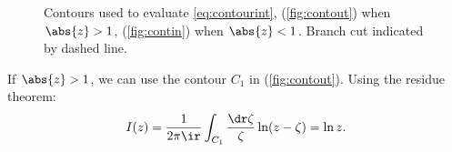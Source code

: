 \documentclass[12pt]{article}
\begin{document}
\begin{figure}
 \begin{center}
 \begin{myenuma}
  \item{}\label{fig:contout}
  \hspace{1cm}
  \item{}\label{fig:contin}
 \end{myenuma}
 \end{center}
  \caption{Contours used to evaluate \eqref{eq:contourint}, (\ref{fig:contout}) when $\abs{z}>1$, (\ref{fig:contin}) when $\abs{z}<1$. Branch cut indicated by dashed line.}\label{fig:contours}
\end{figure}

If $\abs{z}>1$, we can use the contour $C_1$ in (\ref{fig:contout}).
Using the residue theorem:
%
\begin{equation}\label{eq:intout}
  I(z) = \frac{1}{2\pi\ir}\int_{C_1} \frac{\dr\zeta}{\zeta} \ln(z-\zeta) = \ln z.
\end{equation}
%
\end{document}
